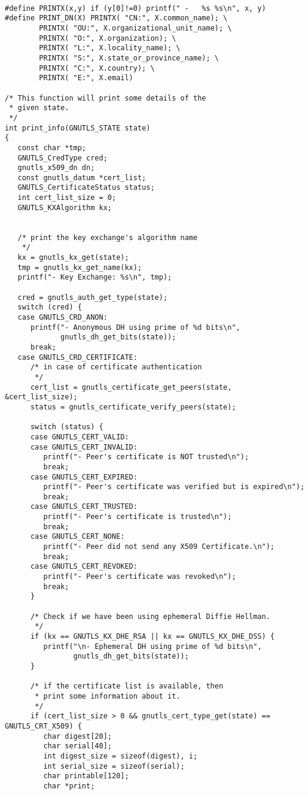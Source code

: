 \begin{verbatim}

#define PRINTX(x,y) if (y[0]!=0) printf(" -   %s %s\n", x, y)
#define PRINT_DN(X) PRINTX( "CN:", X.common_name); \
        PRINTX( "OU:", X.organizational_unit_name); \
        PRINTX( "O:", X.organization); \
        PRINTX( "L:", X.locality_name); \
        PRINTX( "S:", X.state_or_province_name); \
        PRINTX( "C:", X.country); \
        PRINTX( "E:", X.email)

/* This function will print some details of the
 * given state.
 */
int print_info(GNUTLS_STATE state)
{
   const char *tmp;
   GNUTLS_CredType cred;
   gnutls_x509_dn dn;
   const gnutls_datum *cert_list;
   GNUTLS_CertificateStatus status;
   int cert_list_size = 0;
   GNUTLS_KXAlgorithm kx;


   /* print the key exchange's algorithm name
    */
   kx = gnutls_kx_get(state);
   tmp = gnutls_kx_get_name(kx);
   printf("- Key Exchange: %s\n", tmp);

   cred = gnutls_auth_get_type(state);
   switch (cred) {
   case GNUTLS_CRD_ANON:
      printf("- Anonymous DH using prime of %d bits\n",
             gnutls_dh_get_bits(state));
      break;
   case GNUTLS_CRD_CERTIFICATE:
      /* in case of certificate authentication
       */
      cert_list = gnutls_certificate_get_peers(state, &cert_list_size);
      status = gnutls_certificate_verify_peers(state);

      switch (status) {
      case GNUTLS_CERT_VALID:
      case GNUTLS_CERT_INVALID:
         printf("- Peer's certificate is NOT trusted\n");
         break;
      case GNUTLS_CERT_EXPIRED:
         printf("- Peer's certificate was verified but is expired\n");
         break;
      case GNUTLS_CERT_TRUSTED:
         printf("- Peer's certificate is trusted\n");
         break;
      case GNUTLS_CERT_NONE:
         printf("- Peer did not send any X509 Certificate.\n");
         break;
      case GNUTLS_CERT_REVOKED:
         printf("- Peer's certificate was revoked\n");
         break;
      }

      /* Check if we have been using ephemeral Diffie Hellman.
       */
      if (kx == GNUTLS_KX_DHE_RSA || kx == GNUTLS_KX_DHE_DSS) {
         printf("\n- Ephemeral DH using prime of %d bits\n",
                gnutls_dh_get_bits(state));
      }

      /* if the certificate list is available, then
       * print some information about it.
       */
      if (cert_list_size > 0 && gnutls_cert_type_get(state) == GNUTLS_CRT_X509) {
         char digest[20];
         char serial[40];
         int digest_size = sizeof(digest), i;
         int serial_size = sizeof(serial);
         char printable[120];
         char *print;


\end{verbatim}
